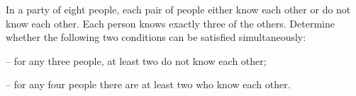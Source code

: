In a party of eight people, each pair of people either know each other or do not know each other. Each person knows exactly three of the others. Determine whether the following two conditions can be satisfied simultaneously:



– for any three people, at least two do not know each other;

– for any four people there are at least two who know each other.